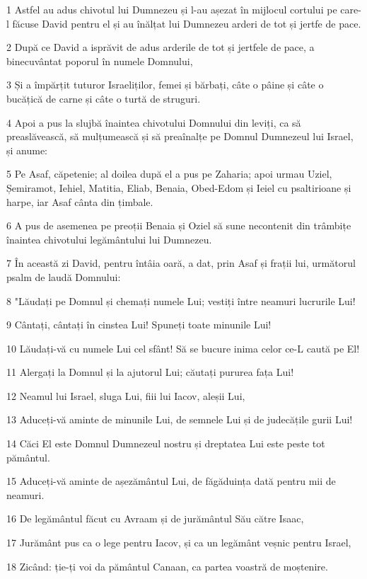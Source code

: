 \par 1 Astfel au adus chivotul lui Dumnezeu și l-au așezat în mijlocul cortului pe care-l făcuse David pentru el și au înălțat lui Dumnezeu arderi de tot și jertfe de pace.
\par 2 După ce David a isprăvit de adus arderile de tot și jertfele de pace, a binecuvântat poporul în numele Domnului,
\par 3 Și a împărțit tuturor Israeliților, femei și bărbați, câte o pâine și câte o bucățică de carne și câte o turtă de struguri.
\par 4 Apoi a pus la slujbă înaintea chivotului Domnului din leviți, ca să preaslăvească, să mulțumească și să preaînalțe pe Domnul Dumnezeul lui Israel, și anume:
\par 5 Pe Asaf, căpetenie; al doilea după el a pus pe Zaharia; apoi urmau Uziel, Șemiramot, Iehiel, Matitia, Eliab, Benaia, Obed-Edom și Ieiel cu psaltirioane și harpe, iar Asaf cânta din țimbale.
\par 6 A pus de asemenea pe preoții Benaia și Oziel să sune necontenit din trâmbițe înaintea chivotului legământului lui Dumnezeu.
\par 7 În această zi David, pentru întâia oară, a dat, prin Asaf și frații lui, următorul psalm de laudă Domnului:
\par 8 "Lăudați pe Domnul și chemați numele Lui; vestiți între neamuri lucrurile Lui!
\par 9 Cântați, cântați în cinstea Lui! Spuneți toate minunile Lui!
\par 10 Lăudați-vă cu numele Lui cel sfânt! Să se bucure inima celor ce-L caută pe El!
\par 11 Alergați la Domnul și la ajutorul Lui; căutați pururea fața Lui!
\par 12 Neamul lui Israel, sluga Lui, fiii lui Iacov, aleșii Lui,
\par 13 Aduceți-vă aminte de minunile Lui, de semnele Lui și de judecățile gurii Lui!
\par 14 Căci El este Domnul Dumnezeul nostru și dreptatea Lui este peste tot pământul.
\par 15 Aduceți-vă aminte de așezământul Lui, de făgăduința dată pentru mii de neamuri.
\par 16 De legământul făcut cu Avraam și de jurământul Său către Isaac,
\par 17 Jurământ pus ca o lege pentru Iacov, și ca un legământ veșnic pentru Israel,
\par 18 Zicând: ție-ți voi da pământul Canaan, ca partea voastră de moștenire.

